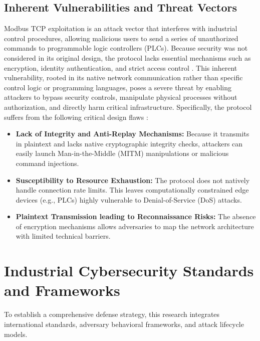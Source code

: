 \newpage
\subsection{Inherent Vulnerabilities and Threat Vectors}
Modbus TCP exploitation is an attack vector that interferes with industrial control procedures, allowing malicious users to send a series of unauthorized commands to programmable logic controllers (PLCs). Because security was not considered in its original design, the protocol lacks essential mechanisms such as encryption, identity authentication, and strict access control \cite{ref_report14}. This inherent vulnerability, rooted in its native network communication rather than specific control logic or programming languages, poses a severe threat by enabling attackers to bypass security controls, manipulate physical processes without authorization, and directly harm critical infrastructure. Specifically, the protocol suffers from the following critical design flaws \cite{ref_report3}\cite{ref_report5}:

\begin{itemize}
    \item \textbf{Lack of Integrity and Anti-Replay Mechanisms:} Because it transmits in plaintext and lacks native cryptographic integrity checks, attackers can easily launch Man-in-the-Middle (MITM) manipulations or malicious command injections.
    \item \textbf{Susceptibility to Resource Exhaustion:} The protocol does not natively handle connection rate limits. This leaves computationally constrained edge devices (e.g., PLCs) highly vulnerable to Denial-of-Service (DoS) attacks.
    \item \textbf{Plaintext Transmission leading to Reconnaissance Risks:} The absence of encryption mechanisms allows adversaries to map the network architecture with limited technical barriers.
\end{itemize}

\newpage
\section[Industrial Cybersecurity Standards and Frameworks]{Industrial Cybersecurity Standards \\ and Frameworks}
To establish a comprehensive defense strategy, this research integrates international standards, adversary behavioral frameworks, and attack lifecycle models.

